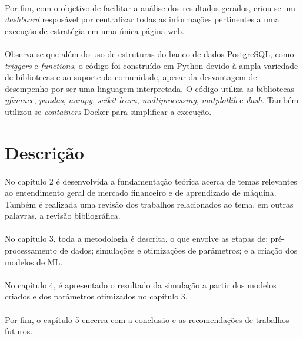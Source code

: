 \paragraph{} Por fim, com o objetivo de facilitar a análise dos resultados gerados, criou-se um \textit{dashboard} resposável por centralizar todas as informações pertinentes a uma execução de estratégia em uma única página web.

\paragraph{} Observa-se que além do uso de estruturas do banco de dados PostgreSQL, como \textit{triggers} e \textit{functions}, o código foi construído em Python devido à ampla variedade de bibliotecas e ao suporte da comunidade, apesar da desvantagem de desempenho por ser uma linguagem interpretada. O código utiliza as bibliotecas \textit{yfinance}, \textit{pandas}, \textit{numpy}, \textit{scikit-learn}, \textit{multiprocessing}, \textit{matplotlib} e \textit{dash}. Também utilizou-se \textit{containers} Docker \cite{docker} para simplificar a execução.



\FloatBarrier
\section{Descrição}

\paragraph{} No capítulo 2 é desenvolvida a fundamentação teórica acerca de temas relevantes ao entendimento geral de mercado financeiro e de aprendizado de máquina. Também é realizada uma revisão dos trabalhos relacionados ao tema, em outras palavras, a revisão bibliográfica.

\paragraph{} No capítulo 3, toda a metodologia é descrita, o que envolve as etapas de: pré-processamento de dados; simulações e otimizações de parâmetros; e a criação dos modelos de ML.

\paragraph{} No capítulo 4, é apresentado o resultado da simulação a partir dos modelos criados e dos parâmetros otimizados no capítulo 3.

\paragraph{} Por fim, o capítulo 5 encerra com a conclusão e as recomendações de trabalhos futuros.